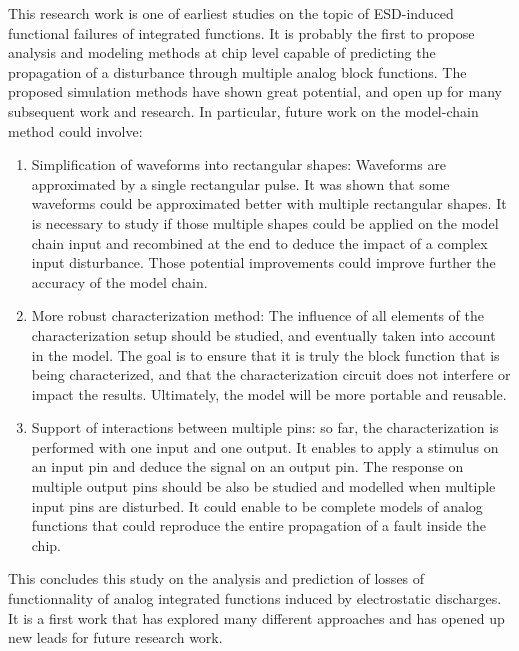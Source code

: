 This research work is one of earliest studies on the topic of ESD-induced functional failures of integrated functions.
It is probably the first to propose analysis and modeling methods at chip level capable of predicting the propagation of a disturbance through multiple analog block functions.
The proposed simulation methods have shown great potential, and open up for many subsequent work and research.
In particular, future work on the model-chain method could involve:

\begin{enumerate}
  \item Simplification of waveforms into rectangular shapes: Waveforms are approximated by a single rectangular pulse.
  It was shown that some waveforms could be approximated better with multiple rectangular shapes.
  It is necessary to study if those multiple shapes could be applied on the model chain input and recombined at the end to deduce the impact of a complex input disturbance.
  Those potential improvements could improve further the accuracy of the model chain.
  \item More robust characterization method: The influence of all elements of the characterization setup should be studied, and eventually taken into account in the model. The goal is to ensure that it is truly the block function that is being characterized, and that the characterization circuit does not interfere or impact the results. Ultimately, the model will be more portable and reusable.
  \item Support of interactions between multiple pins: so far, the characterization is performed with one input and one output.
  It enables to apply a stimulus on an input pin and deduce the signal on an output pin.
  The response on multiple output pins should be also be studied and modelled when multiple input pins are disturbed.
  It could enable to be complete models of analog functions that could reproduce the entire propagation of a fault inside the chip.
\end{enumerate}

This concludes this study on the analysis and prediction of losses of functionnality of analog integrated functions induced by electrostatic discharges.
It is a first work that has explored many different approaches and has opened up new leads for future research work.
